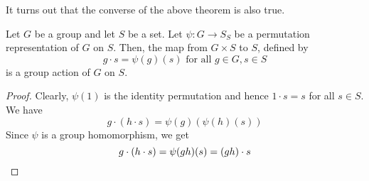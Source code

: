 It turns out that the converse of the above theorem is also true. 
\begin{prop} \label{prop:permutation-gives-action}
    Let $G$ be a group and let $S$ be a set. Let $\psi \colon G \to S_S$ be a permutation representation of $G$ on $S$. Then, the map from $G \times S$ to $S$, defined by
    \[
        g\cdot s = \psi(g)(s) \text{ for all }g\in G, s \in S
    \]
    is a group action of $G$ on $S$.
\end{prop}
\begin{proof}
    Clearly, $\psi(1)$ is the identity permutation and hence $1\cdot s = s$ for all $s \in S$. We have
    \[
        g\cdot(h\cdot s) = \psi(g)\left( \psi(h)(s) \right)
    \]
    Since $\psi$ is a group homomorphism, we get
    \[
        g \cdot(h \cdot s) = \psi(gh)(s) = (gh) \cdot s \qedhere
    \]
\end{proof}

